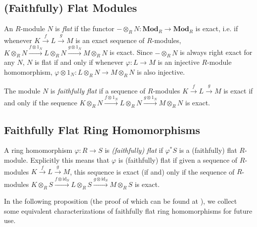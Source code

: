 \documentclass[oneside,11pt]{amsart}
\newcommand{\bMod}{\ensuremath{\textbf{Mod}}}
\newcommand{\id}{\ensuremath{\text{id}}}
\theoremstyle{definition}
\newtheorem{proof techniques}{Proof Techniques}
\begin{document}

\subsection{(Faithfully) Flat Modules}

An $R$-module $N$ is \emph{flat} if the functor $- \otimes_R N : \bMod_R \to \bMod_R$ is exact, i.e. if whenever $K \overset{f}{\to} L \overset{g}{\to} M$ is an exact sequence of $R$-modules, $K \otimes_R N \overset{f \otimes 1_N}{\to} L \otimes_R N \overset{g \otimes 1_N}{\to} M \otimes_R N$ is exact. Since $- \otimes_R N$ is always right exact for any $N$, $N$ is flat if and only if whenever $\varphi : L \to M$ is an injective $R$-module homomorphism, $\varphi \otimes 1_N : L \otimes_R N \to M \otimes_R N$ is also injective. 



The module $N$ is \emph{faithfully flat} if a sequence of $R$-modules $K \overset{f}{\to} L \overset{g}{\to} M$ is exact if and only if the sequence $K \otimes_R N \overset{f \otimes 1_N}{\to} L \otimes_R N \overset{g \otimes 1_N}{\to} M \otimes_R N$ is exact. 


\subsection{Faithfully Flat Ring Homomorphisms}

A ring homomorphism $\varphi : R \to S$ is \emph{(faithfully) flat} if $\varphi^* S$ is a (faithfully) flat $R$-module. Explicitly this means that $\varphi$ is (faithfully) flat if given a sequence of $R$-modules $K \overset{f}{\to} L \overset{g}{\to} M$, this sequence is exact (if and) only if the sequence of $R$-modules $K \otimes_R S  \overset{f \otimes \id_S}{\to} L \otimes_R S \overset{g \otimes \id_S}{\to} M \otimes_R S$ is exact. 

In the following proposition (the proof of which can be found at \cite[{00H9}]{stacks-project}), we collect some equivalent characterizations of faithfully flat ring homomorphisms  for future use.
\end{document}
